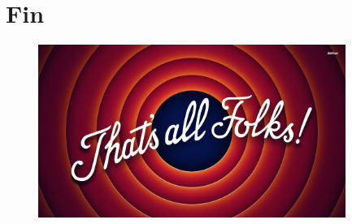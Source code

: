 \documentclass[10pt]{beamer}
\begin{document}
\section*{Fin}

\begin{frame}
\begin{figure}
\centering
\includegraphics[width = 10cm]{images/taf.jpg}
\end{figure}
\end{frame}
\end{document}

